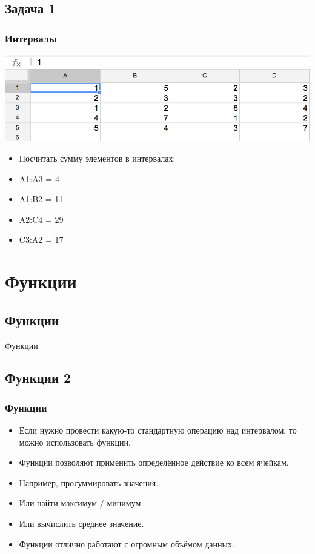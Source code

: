 \documentclass[compress,red]{beamer}
\begin{document}
\subsection{Задача 1}
\begin{frame}[fragile]
  \frametitle{Интервалы}
  \centerline{\includegraphics[width=1.0\textwidth]{images/04.png}}
  \begin{itemize}[<+->]
      \item Посчитать сумму элементов в интервалах:
      \item A1:A3 = 4
      \item A1:B2 = 11
      \item A2:C4 = 29
      \item C3:A2 = 17
  \end{itemize}
\end{frame}

\section{Функции}
\subsection{Функции}
\begin{frame}
  \begin{center}
    \Huge{Функции}
  \end{center}
\end{frame}

\subsection{Функции 2}
\begin{frame}[fragile]
  \frametitle{Функции}
  \begin{itemize}
    \item Если нужно провести какую-то стандартную операцию над интервалом, то можно использовать функции.
    \item Функции позволяют применить определённое действие ко всем ячейкам.
    \item Например, просуммировать значения.
    \item Или найти максимум / минимум.
    \item Или вычислить среднее значение.
    \item Функции отлично работают с огромным объёмом данных.
  \end{itemize}
\end{frame}
\end{document}

